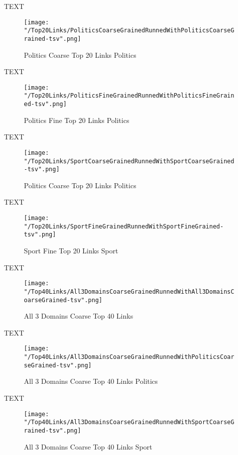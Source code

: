 \documentclass[thesis=M,english]{FITthesis}[2012/10/20]
\begin{document}
	TEXT

	\begin{figure}\centering
		\texttt{[image: "/Top20Links/PoliticsCoarseGrainedRunnedWithPoliticsCoarseGrained-tsv".png]}
		\caption{Politics Coarse Top 20 Links Politics}\label{}
	\end{figure}	

	TEXT	

	\begin{figure}\centering
		\texttt{[image: "/Top20Links/PoliticsFineGrainedRunnedWithPoliticsFineGrained-tsv".png]}
		\caption{Politics Fine Top 20 Links Politics}\label{}
	\end{figure}

	
	TEXT

	\begin{figure}\centering
		\texttt{[image: "/Top20Links/SportCoarseGrainedRunnedWithSportCoarseGrained-tsv".png]}
		\caption{Politics Coarse Top 20 Links Politics}\label{}
	\end{figure}		
	
		TEXT	

	\begin{figure}\centering
		\texttt{[image: "/Top20Links/SportFineGrainedRunnedWithSportFineGrained-tsv".png]}
		\caption{Sport Fine Top 20 Links Sport}\label{}	
	\end{figure}

	TEXT

	\begin{figure}\centering
		\texttt{[image: "/Top40Links/All3DomainsCoarseGrainedRunnedWithAll3DomainsCoarseGrained-tsv".png]}
		\caption{All 3 Domains Coarse Top 40 Links}\label{}
	\end{figure}

	TEXT

	\begin{figure}\centering
		\texttt{[image: "/Top40Links/All3DomainsCoarseGrainedRunnedWithPoliticsCoarseGrained-tsv".png]}
		\caption{All 3 Domains Coarse Top 40 Links Politics}\label{}
	\end{figure}	

	TEXT	

	\begin{figure}\centering
		\texttt{[image: "/Top40Links/All3DomainsCoarseGrainedRunnedWithSportCoarseGrained-tsv".png]}
		\caption{All 3 Domains Coarse Top 40 Links Sport}\label{}
	\end{figure}
	
\end{document}
